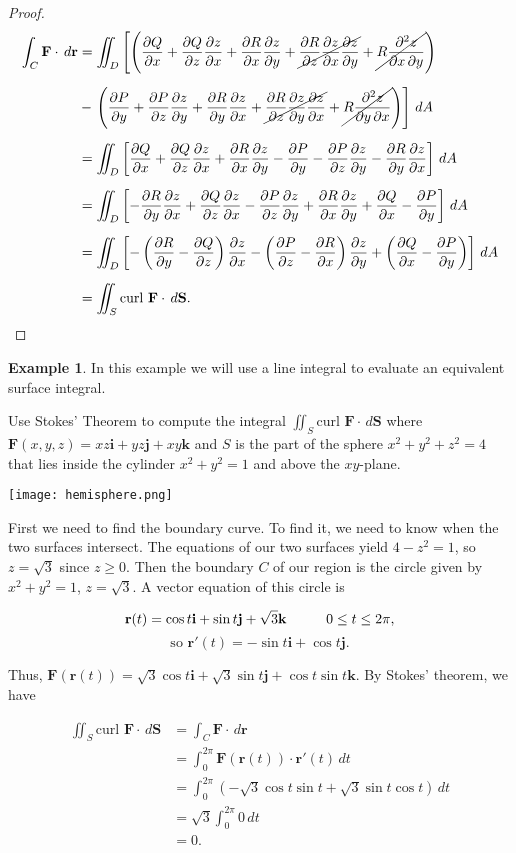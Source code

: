 \documentclass[11pt,oneside,english]{amsart}
\theoremstyle{definition}
\newtheorem*{example}{Example}
\newcommand{\pspace}{\hspace{10mm}}
\newcommand{\pp}[2]{\frac{\partial{#1}}{\partial{#2}}}
\begin{document}
\begin{proof}
\begin{align*}
\int_C\mathbf{F}\cdot\,d\mathbf{r}&=\iint_D\left[\left(\pp{Q}{x}+\pp{Q}{z}\pp{z}{x}+\pp{R}{x}\pp{z}{y}+\cancel{\pp{R}{z}\pp{z}{x}\pp{z}{y}}+\cancel{R\pp{^2z}{x\,\partial y}}\right)\right.\\[2mm]
&-\left.\left(\pp{P}{y}+\pp{P}{z}\pp{z}{y}+\pp{R}{y}\pp{z}{x}+\cancel{\pp{R}{z}\pp{z}{y}\pp{z}{x}}+\cancel{R\pp{^2z}{y\,\partial x}}\right)\right]\,dA\\[2mm]
&=\iint_D\left[\pp{Q}{x}+\pp{Q}{z}\pp{z}{x}+\pp{R}{x}\pp{z}{y}-\pp{P}{y}-\pp{P}{z}\pp{z}{y}-\pp{R}{y}\pp{z}{x}\right]\,dA\\[2mm]
&=\iint_D\left[-\pp{R}{y}\pp{z}{x}+\pp{Q}{z}\pp{z}{x}-\pp{P}{z}\pp{z}{y}+\pp{R}{x}\pp{z}{y}+\pp{Q}{x}-\pp{P}{y}\right]\,dA\\[2mm]
&=\iint_D\left[-\left(\pp{R}{y}-\pp{Q}{z}\right)\pp{z}{x}-\left(\pp{P}{z}-\pp{R}{x}\right)\pp{z}{y}+\left(\pp{Q}{x}-\pp{P}{y}\right)\right]\,dA\\[2mm]
&=\iint_S\text{curl }\mathbf{F}\cdot\,d\mathbf{S}.
\end{align*}
\end{proof}

\pagebreak


\begin{example}
In this example we will use a line integral to evaluate an equivalent surface integral.

Use Stokes' Theorem to compute the integral $\iint_S\text{curl }\mathbf{F}\cdot\,d\mathbf{S}$ where $\mathbf{F}(x,y,z)=xz\mathbf{i}+yz\mathbf{j}+xy\mathbf{k}$ and $S$ is the part of the sphere $x^2+y^2+z^2=4$ that lies inside the cylinder $x^2+y^2=1$ and above the $xy$-plane.

\begin{center}
\texttt{[image: hemisphere.png]}
\end{center}

First we need to find the boundary curve. To find it, we need to know when the two surfaces intersect. The equations of our two surfaces yield $4-z^2=1$, so $z=\sqrt{3}$ since $z\geq 0$. Then the boundary $C$ of our region is the circle given by $x^2+y^2=1$, $z=\sqrt{3}$. A vector equation of this circle is

\[
\mathbf{r}(t)=\cos t\mathbf{i}+\sin t\mathbf{j}+\sqrt{3}\mathbf{k}\pspace 0\leq t\leq 2\pi,
\]
\[
\text{so }\mathbf{r}'(t)=-\sin t\mathbf{i}+\cos t\mathbf{j}.
\]

Thus, $\mathbf{F}(\mathbf{r}(t))=\sqrt{3}\cos t\mathbf{i}+\sqrt{3}\sin t\mathbf{j}+\cos t\sin t\mathbf{k}$. By Stokes' theorem, we have

\begin{align*}
\iint_S\text{curl }\mathbf{F}\cdot\,d\mathbf{S}&=\int_C\mathbf{F}\cdot\,d\mathbf{r}\\[2mm]
&=\int_0^{2\pi}\mathbf{F}(\mathbf{r}(t))\cdot\mathbf{r}'(t)\,dt\\[2mm]
&=\int_0^{2\pi}(-\sqrt{3}\cos t\sin t+\sqrt{3}\sin t\cos t)\,dt\\[2mm]
&=\sqrt{3}\int_0^{2\pi}0\,dt\\[2mm]
&=0.
\end{align*}
\end{example}
\end{document}
